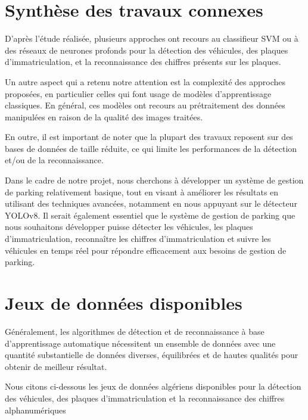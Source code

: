 \section{Synthèse des travaux connexes}

D'après l'étude réalisée, plusieurs approches ont recours au classifieur SVM ou à des réseaux de neurones profonds pour la détection des véhicules, des plaques d'immatriculation, et la reconnaissance des chiffres présents sur les plaques.

Un autre aspect qui a retenu notre attention est la complexité des approches proposées, en particulier celles qui font usage de modèles d'apprentissage classiques. En général, ces modèles ont recours au prétraitement des données manipulées en raison de la qualité des images traitées.

En outre, il est important de noter que la plupart des travaux reposent sur des bases de données de taille réduite, ce qui limite les performances de la détection et/ou de la reconnaissance.

Dans le cadre de notre projet, nous cherchons à développer un système de gestion de parking relativement basique, tout en visant à améliorer les résultats en utilisant des techniques avancées, notamment en nous appuyant sur le détecteur YOLOv8. Il serait également essentiel que le système de gestion de parking que nous souhaitons développer puisse détecter les véhicules, les plaques d'immatriculation, reconnaître les chiffres d'immatriculation et suivre les véhicules en temps réel pour répondre efficacement aux besoins de gestion de parking.



\section{Jeux de données disponibles}

Généralement, les algorithmes de détection et de reconnaissance à base d'apprentissage automatique nécessitent un ensemble de données avec une quantité substantielle de données diverses, équilibrées et de hautes qualités pour obtenir de meilleur résultat. 

Nous citons ci-dessous les jeux de données algériens disponibles pour la détection des véhicules, des plaques d'immatriculation et la reconnaissance des chiffres alphanumériques

